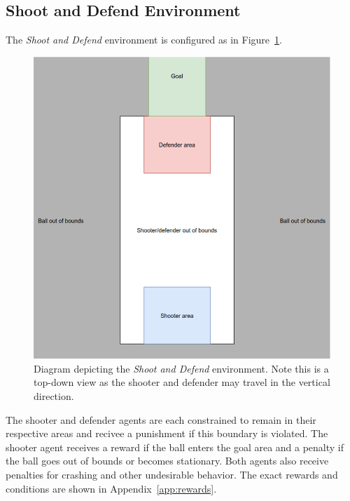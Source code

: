 \documentclass{article}
\begin{document}
\subsection{Shoot and Defend Environment}\label{subsec:sad_env}
The \textit{Shoot and Defend} environment is configured as in Figure~\ref{fig:sad_env}. 
\begin{figure}[t!]
  \includegraphics[width=\linewidth]{imgs/ShootAndDefend_env}
  \caption{Diagram depicting the \textit{Shoot and Defend} environment. Note this is a top-down view as the shooter and defender may travel in the vertical direction.}
  \label{fig:sad_env}
\end{figure}
The shooter and defender agents are each constrained to remain in their respective areas and recivee a punishment if this boundary is violated. 
The shooter agent receives a reward if the ball enters the goal area and a penalty if the ball goes out of bounds or becomes stationary. 
Both agents also receive penalties for crashing and other undesirable behavior. 
The exact rewards and conditions are shown in Appendix~\ref{app:rewards}. \\
\end{document}
